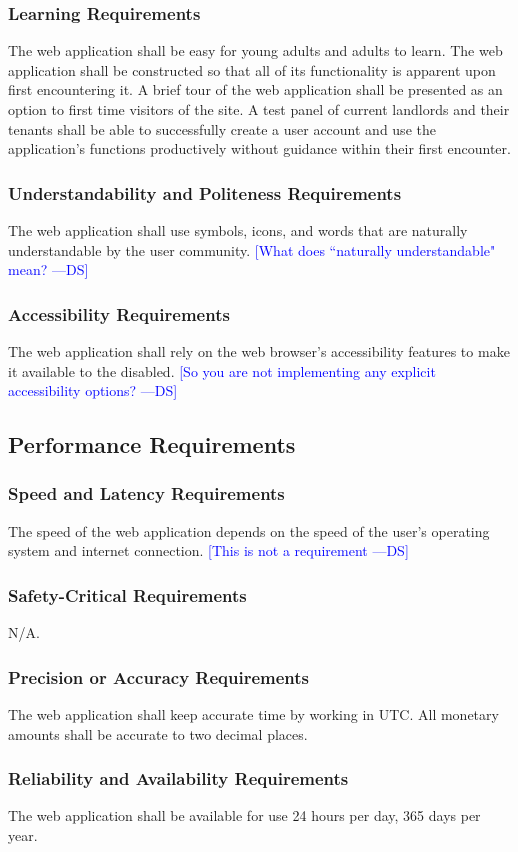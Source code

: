 \documentclass[12pt, titlepage]{article}
\newcommand{\authornote}[3]{\textcolor{#1}{[#3 ---#2]}}
\newcommand{\authornote}[3]{}
\newcommand{\ds}[1]{\authornote{blue}{DS}{#1}}
\begin{document}
{\subsubsection{Learning Requirements}
The web application shall be easy for young adults and adults to learn. The web 
application shall be constructed so that all of its functionality is apparent 
upon first encountering it. A brief tour of the web application shall be 
presented as an option to first time visitors of the site. A test panel of 
current landlords and their tenants shall be able to successfully create a user 
account and use the application's functions productively without guidance within 
their first encounter.
\subsubsection{Understandability and Politeness Requirements}
The web application shall use symbols, icons, and words that are naturally 
understandable by the user community. 
\ds{What does ``naturally understandable" mean?}
\subsubsection{Accessibility Requirements}
The web application shall rely on the web browser's accessibility features to 
make it available to the disabled.
\ds{So you are not implementing any explicit accessibility options?}
\subsection{Performance Requirements}
\subsubsection{Speed and Latency Requirements}
The speed of the web application depends on the speed of the user's operating 
system and internet connection.
\ds{This is not a requirement}
\subsubsection{Safety-Critical Requirements}
N/A.
\subsubsection{Precision or Accuracy Requirements}
The web application shall keep accurate time by working in UTC. All monetary 
amounts shall be accurate to two decimal places. 
\subsubsection{Reliability and Availability Requirements}
The web application shall be available for use 24 hours per day, 365 days per 
year.
}
\end{document}
